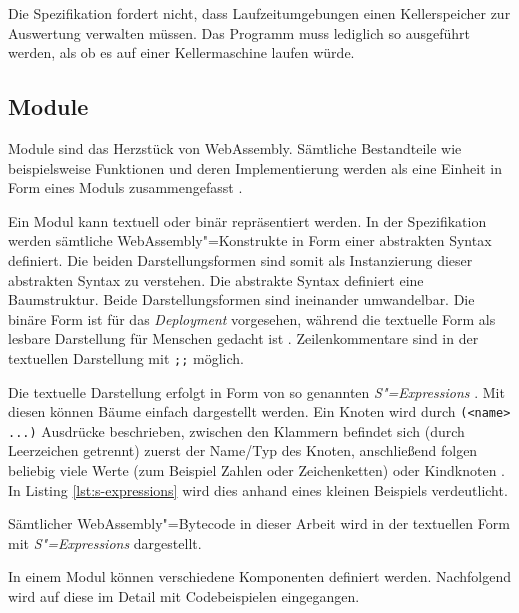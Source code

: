 Die Spezifikation fordert nicht, dass Laufzeitumgebungen einen Kellerspeicher zur Auswertung verwalten müssen. Das Programm muss lediglich so ausgeführt werden, als ob es auf einer Kellermaschine laufen würde.

\subsection{Module}
\label{subsec:WebAssembly-Module}
Module sind das Herzstück von WebAssembly. Sämtliche Bestandteile wie beispielsweise Funktionen und deren Implementierung werden als eine Einheit in Form eines Moduls zusammengefasst \cite{WebAssemblySpecification}.

Ein Modul kann textuell oder binär repräsentiert werden. In der Spezifikation werden sämtliche WebAssembly"=Konstrukte in Form einer abstrakten Syntax definiert. Die beiden Darstellungsformen sind somit als Instanzierung dieser abstrakten Syntax zu verstehen. Die abstrakte Syntax definiert eine Baumstruktur. Beide Darstellungsformen sind ineinander umwandelbar. Die binäre Form ist für das \emph{Deployment} vorgesehen, während die textuelle Form als lesbare Darstellung für Menschen gedacht ist \cite{WebAssemblySpecification} \cite{MDNWebAssembly}. Zeilenkommentare sind in der textuellen Darstellung mit \lstinline{;;} möglich.

Die textuelle Darstellung erfolgt in Form von so genannten \emph{S"=Expressions} \cite{WebAssemblySpecification}. Mit diesen können Bäume einfach dargestellt werden. Ein Knoten wird durch \lstinline{(<name> ...)} Ausdrücke beschrieben, zwischen den Klammern befindet sich (durch Leerzeichen getrennt) zuerst der Name/Typ des Knoten, anschließend folgen beliebig viele Werte (zum Beispiel Zahlen oder Zeichenketten) oder Kindknoten \cite{MDNWebAssembly}. In Listing \ref{lst:s-expressions} wird dies anhand eines kleinen Beispiels verdeutlicht.



Sämtlicher WebAssembly"=Bytecode in dieser Arbeit wird in der textuellen Form mit \emph{S"=Expressions} dargestellt.

In einem Modul können verschiedene Komponenten definiert werden. Nachfolgend wird auf diese im Detail mit Codebeispielen eingegangen.

